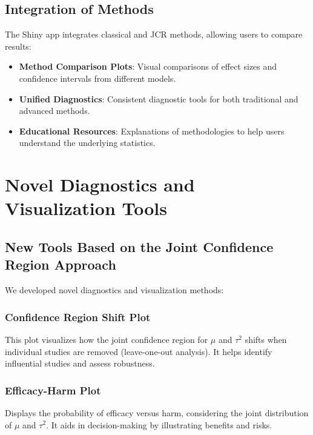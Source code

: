 \documentclass[12pt,a4paper]{report}
\begin{document}
\section{Integration of Methods}
\label{sec:integration_methods}

The Shiny app integrates classical and JCR methods, allowing users to compare results:

\begin{itemize}
    \item \textbf{Method Comparison Plots}: Visual comparisons of effect sizes and confidence intervals from different models.
    \item \textbf{Unified Diagnostics}: Consistent diagnostic tools for both traditional and advanced methods.
    \item \textbf{Educational Resources}: Explanations of methodologies to help users understand the underlying statistics.
\end{itemize}

\chapter{Novel Diagnostics and Visualization Tools}
\label{chap:novel_diagnostics}

\section{New Tools Based on the Joint Confidence Region Approach}
\label{sec:new_tools_jcr}

We developed novel diagnostics and visualization methods:

\subsection{Confidence Region Shift Plot}
\label{subsec:confidence_region_shift}

This plot visualizes how the joint confidence region for $\mu$ and $\tau^2$ shifts when individual studies are removed (leave-one-out analysis). It helps identify influential studies and assess robustness.

\subsection{Efficacy-Harm Plot}
\label{subsec:efficacy_harm_plot}

Displays the probability of efficacy versus harm, considering the joint distribution of $\mu$ and $\tau^2$. It aids in decision-making by illustrating benefits and risks.
\end{document}
